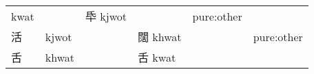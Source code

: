 \documentclass[14pt,a4paper]{scrartcl}
\begin{document}
\begin{longtable}[c]{@{}llllll@{}}
\begin{minipage}[t]{0.14\columnwidth}
kwat
\strut\end{minipage} &
\begin{minipage}[t]{0.14\columnwidth}\raggedright\strut
\strut\end{minipage} &
\begin{minipage}[t]{0.14\columnwidth}\raggedright\strut
氒 kjwot
\strut\end{minipage} &
\begin{minipage}[t]{0.14\columnwidth}\raggedright\strut
\strut\end{minipage} &
\begin{minipage}[t]{0.14\columnwidth}\raggedright\strut
pure:other
\strut\end{minipage}\tabularnewline
\begin{minipage}[t]{0.14\columnwidth}\raggedright\strut
活
\strut\end{minipage} &
\begin{minipage}[t]{0.14\columnwidth}\raggedright\strut
kjwot
\strut\end{minipage} &
\begin{minipage}[t]{0.14\columnwidth}\raggedright\strut
\strut\end{minipage} &
\begin{minipage}[t]{0.14\columnwidth}\raggedright\strut
闊 khwat
\strut\end{minipage} &
\begin{minipage}[t]{0.14\columnwidth}\raggedright\strut
\strut\end{minipage} &
\begin{minipage}[t]{0.14\columnwidth}\raggedright\strut
pure:other
\strut\end{minipage}\tabularnewline
\begin{minipage}[t]{0.14\columnwidth}\raggedright\strut
舌
\strut\end{minipage} &
\begin{minipage}[t]{0.14\columnwidth}\raggedright\strut
khwat
\strut\end{minipage} &
\begin{minipage}[t]{0.14\columnwidth}\raggedright\strut
\strut\end{minipage} &
\begin{minipage}[t]{0.14\columnwidth}\raggedright\strut
舌 kwat
\strut\end{minipage} &
\begin{minipage}[t]{0.14\columnwidth}\raggedright\strut
\strut\end{minipage} &
\begin{minipage}[t]{0.14\columnwidth}\raggedright\strut

\end{minipage}
\end{longtable}
\end{document}
